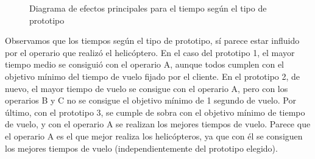 \documentclass[12pt,a4paper,twoside,openright,titlepage,final]{article}
\begin{document}
\begin{figure}[htbp!]
	\centering
	\caption{Diagrama de efectos principales para el tiempo según el tipo de prototipo} \label{fig:efectos_principales_prototipos}
\end{figure}

Observamos que los tiempos según el tipo de prototipo, sí parece estar influido por el operario que realizó el helicóptero. En el caso del prototipo 1, el mayor tiempo medio se consiguió con el operario A, aunque todos cumplen con el objetivo mínimo del tiempo de vuelo fijado por el cliente. En el prototipo 2, de nuevo, el mayor tiempo de vuelo se consigue con el operario A, pero con los operarios B y C no se consigue el objetivo mínimo de 1 segundo de vuelo. Por último, con el prototipo 3, se cumple de sobra con el objetivo mínimo de tiempo de vuelo, y con el operario A se realizan los mejores tiempos de vuelo. Parece que el operario A es el que mejor realiza los helicópteros, ya que con él se consiguen los mejores tiempos de vuelo (independientemente del prototipo elegido).\\
\end{document}
